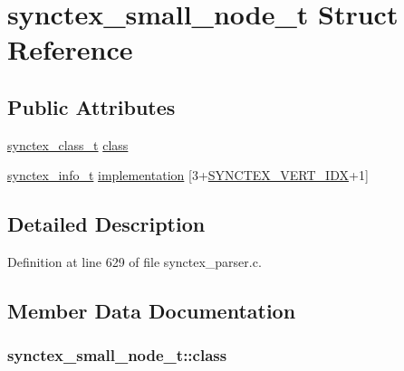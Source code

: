 \hypertarget{structsynctex__small__node__t}{\section{synctex\+\_\+small\+\_\+node\+\_\+t Struct Reference}
\label{structsynctex__small__node__t}
}
\subsection*{Public Attributes}
\begin{DoxyCompactItemize}
\item 
\hyperlink{synctex__parser_8c_a68d11a2cb22716e7abd35cffed7d54c5}{synctex\+\_\+class\+\_\+t} \hyperlink{structsynctex__small__node__t_ab8b9d53097fbadd8a796ebceabe9f1fc}{class}
\item 
\hyperlink{synctex__parser_8c_a864f981cdab43a24765efb685074cf70}{synctex\+\_\+info\+\_\+t} \hyperlink{structsynctex__small__node__t_a44b54a9cc92db940a8e32a44c76c439b}{implementation} \mbox{[}3+\hyperlink{synctex__parser_8c_aef855344b4c1f2873d77ee339389d10d}{S\+Y\+N\+C\+T\+E\+X\+\_\+\+V\+E\+R\+T\+\_\+\+I\+D\+X}+1\mbox{]}
\end{DoxyCompactItemize}


\subsection{Detailed Description}


Definition at line 629 of file synctex\+\_\+parser.\+c.



\subsection{Member Data Documentation}
\hypertarget{structsynctex__small__node__t_ab8b9d53097fbadd8a796ebceabe9f1fc}{
\subsubsection[{class}]{ synctex\+\_\+small\+\_\+node\+\_\+t\+::class}}\label{structsynctex__small__node__t_ab8b9d53097fbadd8a796ebceabe9f1fc}


